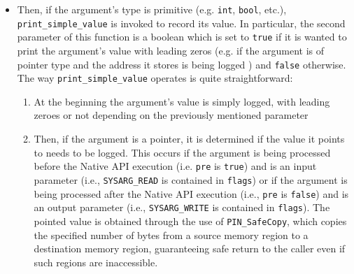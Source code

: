 \begin{itemize}
\item Then, if the argument's type is primitive (e.g. \texttt{int}, \texttt{bool}, etc.),  \texttt{print\_simple\_value} is invoked to record its value. In particular, the second parameter of this function is a boolean which is set to \texttt{true} if it is wanted to print the argument's value with leading zeros (e.g. if the argument is of pointer type and the address it stores is being logged ) and \texttt{false} otherwise. The way \texttt{print\_simple\_value} operates is quite straightforward:
\begin{enumerate}
\item At the beginning the argument's value is simply logged, with leading zeroes or not depending on the previously mentioned parameter
\item Then, if the argument is a pointer, it is determined if the value it points to needs to be logged. This occurs if the argument is being processed before the Native API execution (i.e. \texttt{pre} is \texttt{true}) and is an input parameter (i.e., \texttt{SYSARG\_READ} is contained in \texttt{flags}) or if the argument is being processed after the Native API execution (i.e., \texttt{pre} is \texttt{false}) and is an output parameter (i.e., \texttt{SYSARG\_WRITE} is contained in \texttt{flags}). The pointed value is obtained through the use of \texttt{PIN\_SafeCopy}, which copies the specified number of bytes from a source memory region to a destination memory region, guaranteeing safe return to the caller even if such regions are inaccessible.  
\end{enumerate}

\end{itemize}

